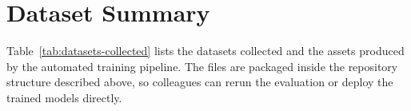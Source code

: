 \documentclass[11pt,a4paper]{article}
\begin{document}
\section{Dataset Summary}
\label{sec:dataset-summary}

Table~\ref{tab:datasets-collected} lists the datasets collected and the assets
produced by the automated training pipeline. The files are packaged inside the repository
structure described above, so colleagues can rerun the evaluation or deploy the trained models
directly.

\end{document}
